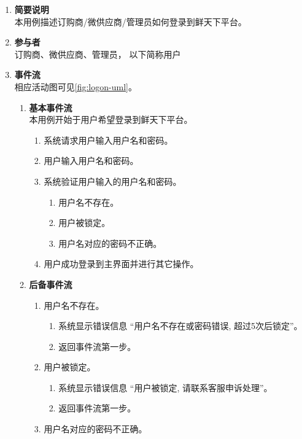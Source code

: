 \begin{enumerate}
	\item \textbf{简要说明}  \\ 本用例描述订购商/微供应商/管理员如何登录到鲜天下平台。
	\item \textbf{参与者} \\ 订购商、微供应商、管理员， 以下简称用户
	\item \textbf{事件流} \\ 相应活动图可见\autoref{fig:logon-uml}。
	\begin{enumerate} 
        \item \textbf{基本事件流} \\ 本用例开始于用户希望登录到鲜天下平台。
        \begin{enumerate}
            \item 系统请求用户输入用户名和密码。
            \item 用户输入用户名和密码。
            \item 系统验证用户输入的用户名和密码。
            \begin{enumerate}
                \item 用户名不存在。
                \item 用户被锁定。
                \item 用户名对应的密码不正确。
            \end{enumerate}
            \item 用户成功登录到主界面并进行其它操作。
        \end{enumerate}
        \item \textbf{后备事件流}
        \begin{enumerate}
            \item 用户名不存在。
            \begin{enumerate}
                \item 系统显示错误信息 “用户名不存在或密码错误, 超过5次后锁定”。
                \item 返回事件流第一步。
            \end{enumerate}
            \item 用户被锁定。
            \begin{enumerate}
                \item 系统显示错误信息 “用户被锁定, 请联系客服申诉处理”。
                \item 返回事件流第一步。
            \end{enumerate}
            \item 用户名对应的密码不正确。

\end{enumerate}
\end{enumerate}
\end{enumerate}
